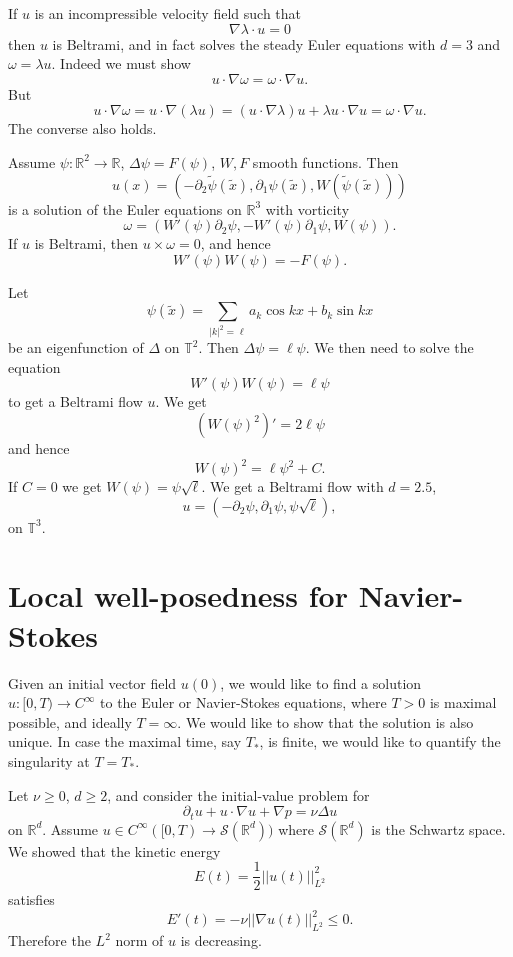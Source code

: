 \documentclass[12pt]{book}
\newcommand{\RR}{\mathbb{R}}
\newcommand{\Torus}{\mathbb{T}}
\newcommand{\Sch}{\mathscr S}
\theoremstyle{definition}
\newenvironment{example}
  {\pushQED{\qed}\renewcommand{\qedsymbol}{$\diamondsuit$}\examplex}
  {\popQED\endexamplex}
\begin{document}
If $u$ is an incompressible velocity field such that
$$\nabla \lambda \cdot u = 0$$
then $u$ is Beltrami, and in fact solves the steady Euler equations with $d = 3$ and $\omega = \lambda u$.
Indeed we must show
$$u \cdot \nabla \omega = \omega \cdot \nabla u.$$
But
$$u \cdot \nabla \omega = u \cdot \nabla(\lambda u) = (u \cdot \nabla \lambda)u + \lambda u \cdot \nabla u = \omega \cdot \nabla u.$$
The converse also holds.

Assume $\psi: \RR^2 \to \RR$, $\Delta \psi = F(\psi)$, $W,F$ smooth functions. Then
$$u(x) = (-\partial_2 \tilde \psi(\tilde x), \partial_1 \psi(\tilde x), W(\tilde \psi(\tilde x)))$$
is a solution of the Euler equations on $\RR^3$ with vorticity
$$\omega = (W'(\psi)\partial_2\psi, -W'(\psi) \partial_1\psi, W(\psi)).$$
If $u$ is Beltrami, then $u \times \omega = 0$, and hence
$$W'(\psi)W(\psi) = -F(\psi).$$

\begin{example}
Let
$$\psi(\tilde x) = \sum_{|k|^2 = \ell} a_k \cos kx + b_k \sin kx$$
be an eigenfunction of $\Delta$ on $\Torus^2$.
Then $\Delta \psi = \ell\psi$. We then need to solve the equation
$$W'(\psi)W(\psi) = \ell\psi$$
to get a Beltrami flow $u$. We get
$$(W(\psi)^2)' = 2\ell \psi$$
and hence
$$W(\psi)^2 = \ell \psi^2 + C.$$
If $C = 0$ we get $W(\psi) = \psi \sqrt \ell$.
We get a Beltrami flow with $d = 2.5$,
$$u = (-\partial_2\psi, \partial_1\psi, \psi \sqrt \ell),$$
on $\Torus^3$.
\end{example}

\chapter{Local well-posedness for Navier-Stokes}
Given an initial vector field $u(0)$, we would like to find a solution $u: [0, T) \to C^\infty$ to the Euler or Navier-Stokes equations, where $T > 0$ is maximal possible, and ideally $T = \infty$.
We would like to show that the solution is also unique.
In case the maximal time, say $T_*$, is finite, we would like to quantify the singularity at $T = T_*$.

Let $\nu \geq 0$, $d \geq 2$, and consider the initial-value problem for
$$\partial_t u + u \cdot \nabla u + \nabla p = \nu \Delta u$$
on $\RR^d$. Assume $u \in C^\infty([0, T) \to \Sch(\RR^d))$ where $\Sch(\RR^d)$ is the Schwartz space.
We showed that the kinetic energy
$$E(t) = \frac{1}{2} ||u(t)||_{L^2}^2$$
satisfies
$$E'(t) = -\nu ||\nabla u(t)||_{L^2}^2 \leq 0.$$
Therefore the $L^2$ norm of $u$ is decreasing.
\end{document}
